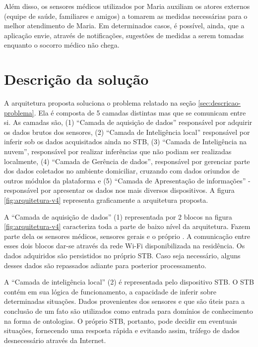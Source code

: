 Além disso, os sensores médicos utilizados por Maria auxiliam os atores
externos (equipe de saúde, familiares e amigos) a tomarem as medidas
necessárias para o melhor atendimento de Maria.  Em determinados casos, é
possível, ainda, que a aplicação envie, através de notificações, sugestões de
medidas a serem tomadas enquanto o socorro médico não chega.

\section{Descrição da solução}
\label{sec:descricao-solucao}

A arquitetura proposta soluciona o problema relatado na seção
\vref{sec:descricao-problema}. Ela é composta de 5 camadas distintas mas que se
comunicam entre si. As camadas são, (1) ``Camada de aquisição de dados''
responsável por adquirir os dados brutos dos sensores, (2) ``Camada de
Inteligência local'' responsável por inferir sob os dados acquisitados ainda no
STB, (3) ``Camada de Inteligência na nuvem'', responsável por realizar
inferências que não podiam ser realizadas localmente, (4) ``Camada de Gerência
de dados'', responsável por gerenciar parte dos dados coletados no ambiente
domiciliar, cruzando com dados oriundos de outros módulos da plataforma
\nextsaude[] e (5) ``Camada de Apresentação de informações'' - responsável por
apresentar os dados nos mais diversos dispositivos. A figura
\ref{fig:arquitetura-v4} representa graficamente a arquitetura proposta.


A ``Camada de aquisição de dados'' (1) representada por 2 blocos na figura 
\ref{fig:arquitetura-v4} caracteriza toda a parte de baixo nível da
arquitetura. Fazem parte dela os sensores médicos, sensores gerais e o próprio
\stb[]. A comunicação entre esses dois blocos dar-se através da rede
Wi-Fi disponibilizada na residência. Os dados adquiridos são persistidos
no próprio STB. Caso seja necessário, alguns desses dados são repassados
adiante para posterior processamento. 

A ``Camada de inteligência local'' (2) é representada pelo dispositivo STB. 
O STB contém em sua lógica de funcionamento, a capacidade de inferir sobre
determinadas situações. Dados provenientes dos sensores e que são úteis para a 
conclusão de um fato são utilizados como entrada para domínios de conhecimento
na forma de ontologias. O próprio STB, portanto, pode decidir em eventuais
situações, fornecendo uma resposta rápida e evitando assim, tráfego de dados 
desnecessário através da Internet.

